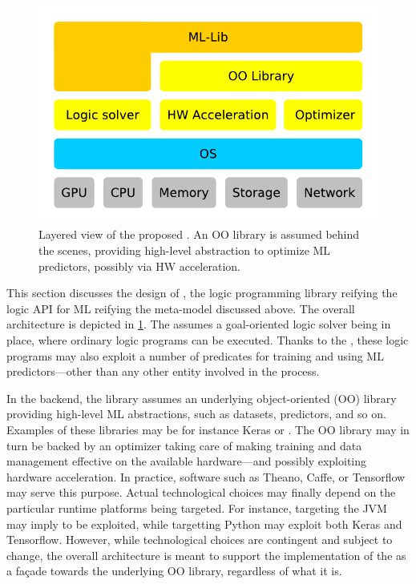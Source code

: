 \documentclass[runningheads]{llncs}
\begin{document}
\begin{figure}
    \centering
    \includegraphics[width=\linewidth]{figures/layers.pdf}
    \caption{Layered view of the proposed \mllib{}. An OO library is assumed behind the scenes, providing high-level abstraction to optimize ML predictors, possibly via HW acceleration.}
    \label{fig:layers}
\end{figure}

This section discusses the design of \mllib, the logic programming library reifying the logic API for ML reifying the meta-model discussed above.
%
The overall architecture is depicted in \cref{fig:layers}.
%
The \mllib{} assumes a goal-oriented logic solver being in place, where ordinary logic programs can be executed.
%
Thanks to the \mllib{}, these logic programs may also exploit a number of predicates for training and using ML predictors---other than any other entity involved in the process.

In the backend, the library assumes an underlying object-oriented (OO) library providing high-level ML abstractions, such as datasets, predictors, and so on.
%
Examples of these libraries may be for instance Keras \cite{chollet2015keras} or \deeplearningforj{} \cite{DL4J}.
%
The OO library may in turn be backed by an optimizer taking care of making training and data management effective on the available hardware---and possibly exploiting hardware acceleration.
%
In practice, software such as Theano, Caffe, or Tensorflow may serve this purpose.
%
Actual technological choices may finally depend on the particular runtime platforms being targeted.
%
For instance, targeting the JVM may imply \deeplearningforj{} to be exploited, while targetting Python may exploit both Keras and Tensorflow.
%
However, while technological choices are contingent and subject to change, the overall architecture is meant to support the implementation of the \mllib{} as a façade towards the underlying OO library, regardless of what it is.
\end{document}

